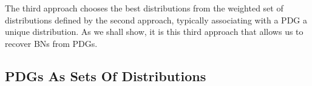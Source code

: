 \documentclass{article}
\theoremstyle{plain}
\theoremstyle{definition}
\theoremstyle{remark}
\numberwithin{equation}{section}
\begin{document}
The third approach chooses the best distributions from the weighted
set of distributions defined by the second approach, typically associating
with a PDG a unique distribution. As we shall show, it is this third
approach that allows us to recover BNs from PDGs. 

\subsection{PDGs As Sets Of Distributions}\label{sec:set-of-distribution-semantics} 
	
\end{document}
